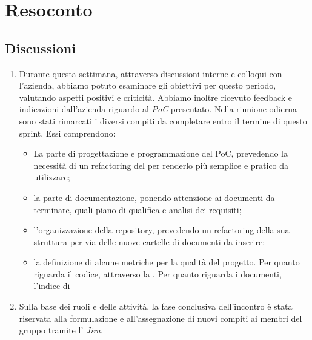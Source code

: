 \section{Resoconto} \label{sec:resoconto}
\subsection{Discussioni} \label{subsec:resdiscussione}
\begin{enumerate}
    \item Durante questa settimana, attraverso discussioni interne e colloqui con l'azienda, abbiamo potuto esaminare gli obiettivi per questo periodo, valutando aspetti positivi e criticità. Abbiamo inoltre ricevuto feedback e indicazioni dall'azienda riguardo al \emph{PoC} presentato. Nella riunione odierna sono stati rimarcati i diversi compiti da completare entro il termine di questo sprint. Essi comprendono: 
    \begin{itemize}
        \item La parte di progettazione e programmazione del PoC, prevedendo la necessità di un refactoring del  per renderlo più semplice e pratico da utilizzare; 
        \item la parte di documentazione, ponendo attenzione ai documenti da terminare, quali piano di qualifica e analisi dei requisiti;
        \item l'organizzazione della repository, prevedendo un refactoring della sua struttura per via delle nuove cartelle di documenti da inserire;
        \item la definizione di alcune metriche per la qualità del progetto. Per quanto riguarda il codice, attraverso la . Per quanto riguarda i documenti, l’indice di 
     \end{itemize}

    \item Sulla base dei ruoli e delle attività, la fase conclusiva dell'incontro è stata riservata alla formulazione e all'assegnazione di nuovi compiti ai membri del gruppo tramite l' \emph{Jira}.

\end{enumerate}


